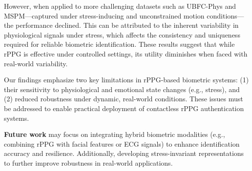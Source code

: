 However, when applied to more challenging datasets such as UBFC-Phys and MSPM—captured under stress-inducing and unconstrained motion conditions—the performance declined. This can be attributed to the inherent variability in physiological signals under stress, which affects the consistency and uniqueness required for reliable biometric identification. These results suggest that while rPPG is effective under controlled settings, its utility diminishes when faced with real-world variability.

Our findings emphasize two key limitations in rPPG-based biometric systems: (1) their sensitivity to physiological and emotional state changes (e.g., stress), and (2) reduced robustness under dynamic, real-world conditions. These issues must be addressed to enable practical deployment of contactless rPPG authentication systems.

\textbf{Future work} may focus on integrating hybrid biometric modalities (e.g., combining rPPG with facial features or ECG signals) to enhance identification accuracy and resilience. Additionally, developing stress-invariant representations to further improve robustness in real-world applications.

